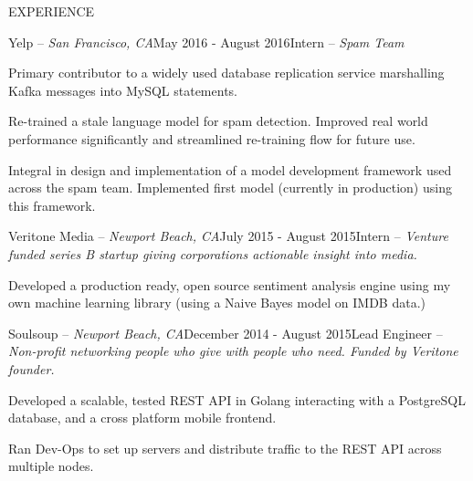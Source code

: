 \documentclass{resume} %
\begin{document}
 
 
\begin{rSection}{EXPERIENCE}

\begin{rSubsection}{Yelp -- {\it San Francisco, CA}}{May 2016 - August 2016}{Intern -- {\sl Spam Team}}

\item Primary contributor to a widely used database replication service marshalling Kafka messages into MySQL
    statements.
\item Re-trained a stale language model for spam detection. Improved real world performance significantly
    and streamlined re-training flow for future use.
\item Integral in design and implementation of a model development framework used across the spam team. Implemented
    first model (currently in production) using this framework.
\end{rSubsection}

\begin{rSubsection}{Veritone Media -- {\it Newport Beach, CA}}{July 2015 - August 2015}{Intern -- {\sl Venture funded series B startup giving corporations actionable insight into media.}}

\item Developed a production ready, open source sentiment analysis engine using my own machine learning library (using a Naive Bayes model on IMDB data.)
\end{rSubsection}

\begin{rSubsection}{Soulsoup -- {\it Newport Beach, CA}}{December 2014 - August 2015}{Lead Engineer -- {\sl Non-profit networking people who give with people who need. Funded by Veritone founder.}}

\item Developed a scalable, tested REST API in Golang interacting with a PostgreSQL database, and a
    cross platform mobile frontend.
\item Ran Dev-Ops to set up servers and distribute traffic to the REST API across multiple nodes.
\end{rSubsection} 

\end{rSection}

\end{document}
